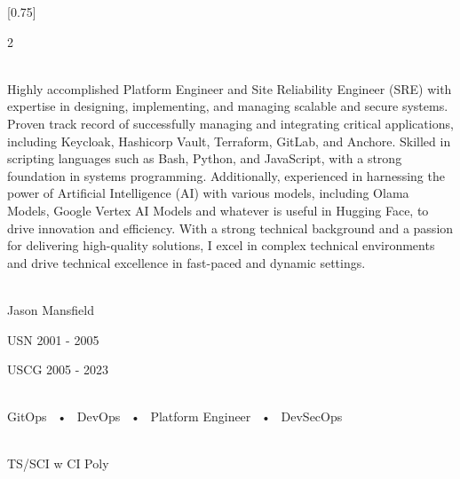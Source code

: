 \documentclass[lighthipster]{simplehipstercv}
\begin{document}
\setlength{\columnsep}{1.5cm}
[0.75]
\begin{paracol}{2}

\paracolbackgroundoptions



\footnotesize
{\setasidefontcolour
\flushright
\begin{center}
\end{center}

\\[0.5em]
Highly accomplished Platform Engineer and Site Reliability Engineer (SRE) with expertise in designing, implementing, and managing scalable and secure systems. Proven track record of successfully managing and integrating critical applications, including Keycloak, Hashicorp Vault, Terraform, GitLab, and Anchore. Skilled in scripting languages such as Bash, Python, and JavaScript, with a strong foundation in systems programming. Additionally, experienced in harnessing the power of Artificial Intelligence (AI) with various models, including Olama Models, Google Vertex AI Models and whatever is useful in Hugging Face, to drive innovation and efficiency. With a strong technical background and a passion for delivering high-quality solutions, I excel in complex technical environments and drive technical excellence in fast-paced and dynamic settings.
{\footnotesize

\bigskip


 \\[0.5em]
Jason Mansfield

USN 2001 - 2005

USCG 2005 - 2023


\bigskip

 \\[0.5em]

GitOps ~•~ DevOps ~•~ Platform Engineer ~•~ DevSecOps

\bigskip

\\[0.5em]
TS/SCI w CI Poly

\begin{flushleft}
\vspace{4em}
\end{flushleft}
\phantom{turn the page}

}}
\end{paracol}
\end{document}

